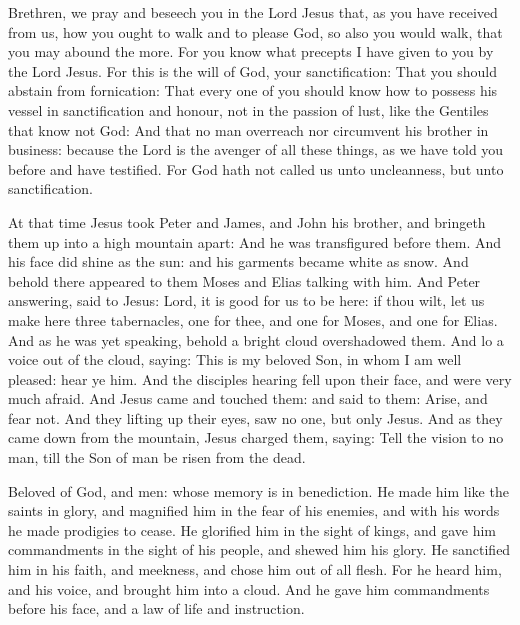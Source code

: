 \begin{multicols}{2}
\bigskip




Brethren, we pray and beseech you in the Lord Jesus that,
as you have received from us, how you ought to walk and to please God, so also
you would walk, that you may abound the more.  For you know what precepts I
have given to you by the Lord Jesus.  For this is the will of God, your
sanctification: That you should abstain from fornication: That every one of you
should know how to possess his vessel in sanctification and honour, not in the
passion of lust, like the Gentiles that know not God: And that no man overreach
nor circumvent his brother in business: because the Lord is the avenger of all
these things, as we have told you before and have testified.  For God hath not
called us unto uncleanness, but unto sanctification.



At that time Jesus took Peter and James, and John his brother,
and bringeth them up into a high mountain apart: And he was transfigured before
them. And his face did shine as the sun: and his garments became white as snow.
And behold there appeared to them Moses and Elias talking with him.  And Peter
answering, said to Jesus: Lord, it is good for us to be here: if thou wilt, let
us make here three tabernacles, one for thee, and one for Moses, and one for
Elias.  And as he was yet speaking, behold a bright cloud overshadowed them.
And lo a voice out of the cloud, saying: This is my beloved Son, in whom I am
well pleased: hear ye him.  And the disciples hearing fell upon their face, and
were very much afraid.  And Jesus came and touched them: and said to them:
Arise, and fear not.  And they lifting up their eyes, saw no one, but only
Jesus.  And as they came down from the mountain, Jesus charged them, saying:
Tell the vision to no man, till the Son of man be risen from the dead.



\bigskip




Beloved of God, and men: whose memory is in benediction.  He made him
like the saints in glory, and magnified him in the fear of his enemies, and
with his words he made prodigies to cease.  He glorified him in the sight of
kings, and gave him commandments in the sight of his people, and shewed him his
glory.  He sanctified him in his faith, and meekness, and chose him out of all
flesh.  For he heard him, and his voice, and brought him into a cloud.  And he
gave him commandments before his face, and a law of life and instruction.



\end{multicols}
